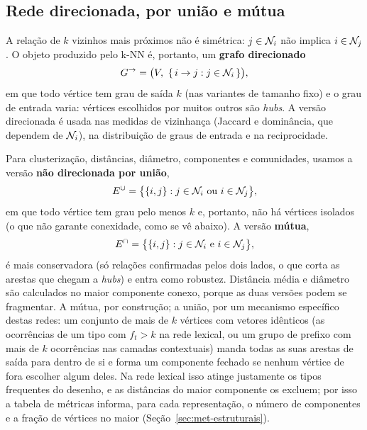 \subsection{Rede direcionada, por união e mútua}\label{sec:red-versoes}

A relação de $k$ vizinhos mais próximos não é simétrica: $j\in\mathcal{N}_i$ não implica $i\in\mathcal{N}_j$. O
objeto produzido pelo k-NN é, portanto, um \textbf{grafo direcionado}
\begin{equation}
    G^{\rightarrow} = \bigl(V,\ \{\,i\to j : j\in\mathcal{N}_i\,\}\bigr),
\end{equation}
em que todo vértice tem grau de saída $k$ (nas variantes de tamanho fixo) e o grau de entrada
varia: vértices escolhidos por muitos outros são \emph{hubs}. A versão direcionada é usada nas
medidas de vizinhança (Jaccard e dominância, que dependem de $\mathcal{N}_i$), na distribuição de graus
de entrada e na reciprocidade.

Para clusterização, distâncias, diâmetro, componentes e comunidades, usamos a versão
\textbf{não direcionada por união},
\begin{equation}
    E^{\cup} = \bigl\{\{i,j\} : j\in\N_i \ \text{ou}\ i\in\N_j\bigr\},
\end{equation}
em que todo vértice tem grau pelo menos $k$ e, portanto, não há vértices isolados (o que não
garante conexidade, como se vê abaixo). A versão
\textbf{mútua},
\begin{equation}
    E^{\cap} = \bigl\{\{i,j\} : j\in\N_i \ \text{e}\ i\in\N_j\bigr\},
\end{equation}
é mais conservadora (só relações confirmadas pelos dois lados, o que corta as arestas que
chegam a \emph{hubs}) e entra como robustez. Distância média e diâmetro são calculados no maior
componente conexo, porque as duas versões podem se fragmentar. A mútua, por construção; a
união, por um mecanismo específico destas redes: um conjunto de mais de $k$ vértices com vetores
idênticos (as ocorrências de um tipo com $f_t>k$ na rede lexical, ou um grupo de prefixo com
mais de $k$ ocorrências nas camadas contextuais) manda todas as suas arestas de saída para
dentro de si e forma um componente fechado se nenhum vértice de fora escolher algum deles. Na
rede lexical isso atinge justamente os tipos frequentes do desenho, e as distâncias do maior
componente os excluem; por isso a tabela de métricas informa, para cada representação, o
número de componentes e a fração de vértices no maior (Seção~\ref{sec:met-estruturais}).

